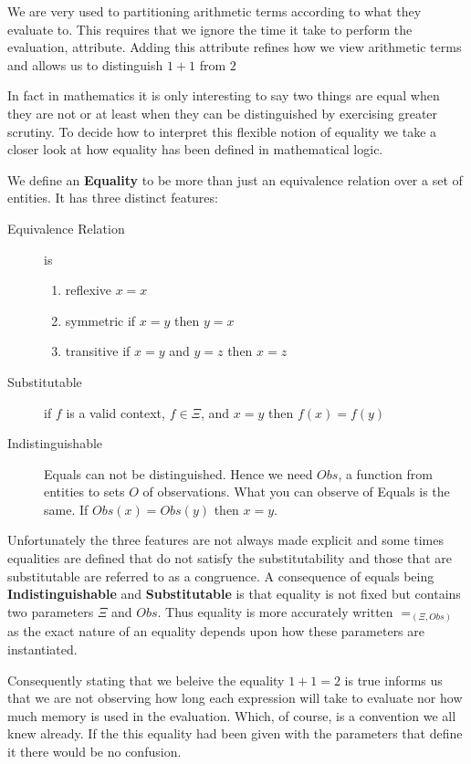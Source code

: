 \noindent We are very used to partitioning arithmetic terms according to what they evaluate to. This requires that we ignore the time it take to perform the evaluation, attribute. Adding this attribute refines how we view arithmetic terms and allows us to distinguish $1+1$ from $2$


In fact in mathematics it is only interesting  to say two things are equal when they are not or at least when they can be distinguished by exercising greater scrutiny.  To  decide how to interpret this flexible notion of equality  we take a closer look at  how equality has been defined in mathematical logic.

We define   an {\bf Equality} to be   more than just an equivalence relation over a set of entities. It has  three distinct features:
\begin{description}
\item [Equivalence Relation] is
   \begin{enumerate}
     \item reflexive $x=x$
     \item symmetric  if $x=y$ then $y=x$
     \item transitive if $x=y$ and $y=z$ then $x=z$
   \end{enumerate}
 \item [Substitutable] if $f$ is a valid context, $f\in \Xi$, and $x=y$ then $f(x) = f(y)$
 \item [Indistinguishable] Equals can not be distinguished.  Hence we need  $Obs$, a function from entities to sets  $O$ of  observations.   What you can observe of Equals is the same.  If $Obs(x) = Obs(y)$ then $x= y$.
\end{description}


Unfortunately the three features are not always made explicit and some times equalities are defined that do not satisfy the substitutability  and those that  are substitutable are referred to as a congruence. 
A consequence of equals being  {\bf Indistinguishable} and {\bf Substitutable}  is that equality is not fixed but contains two parameters $\Xi$ and $Obs$.  Thus equality is more accurately written $=_{(\Xi,Obs)}$ as the  exact nature of an equality depends upon how these parameters are instantiated. 

Consequently stating that we beleive the equality $1+1=2$ is true informs us that we are not observing how long each expression will take to evaluate nor how much memory is used in the evaluation. Which, of course, is a convention we all knew already. If the this equality  had been given with the parameters that define it there would be no confusion.

